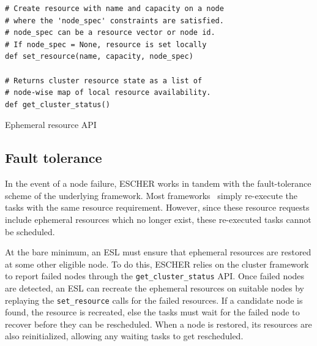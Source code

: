 


\begin{listing}
\begin{verbatim}
# Create resource with name and capacity on a node 
# where the 'node_spec' constraints are satisfied.
# node_spec can be a resource vector or node id.
# If node_spec = None, resource is set locally
def set_resource(name, capacity, node_spec)

# Returns cluster resource state as a list of 
# node-wise map of local resource availability.
def get_cluster_status()
\end{verbatim}
\caption{Ephemeral resource API}
\vspace{-1em}
\label{list:er-api}
\end{listing}

\subsection{Fault tolerance}
\label{sec:esl-faulttol}
In the event of a node failure, ESCHER works in tandem with the fault-tolerance scheme of the underlying framework. Most frameworks~\cite{ray-osdi,kubernetes} simply re-execute the tasks with the same resource requirement. However, since these resource requests include ephemeral resources which no longer exist, these re-executed tasks cannot be scheduled.

At the bare minimum, an ESL must ensure that ephemeral resources are restored at some other eligible node. To do this, ESCHER relies on the cluster framework to report failed nodes through the \lstinline{get_cluster_status} API. Once failed nodes are detected, an ESL can recreate the ephemeral resources on suitable nodes by replaying the \lstinline{set_resource} calls for the failed resources. If a candidate node is found, the resource is recreated, else the tasks must wait for the failed node to recover before they can be rescheduled. When a node is restored, its resources are also reinitialized, allowing any waiting tasks to get rescheduled. %

